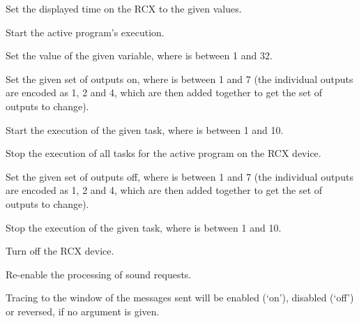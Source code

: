   Set the displayed time on the RCX to the given values.
  
  Start the active program's execution.
  
  Set the value of the given variable, where  is between 1 and 32.
  
  Set the given set of outputs on, where  is between 1 and 7
  (the individual outputs are encoded as 1, 2 and 4, which are then added together to get the set of outputs to change).
  
  Start the execution of the given task, where  is between 1 and 10.
  
  Stop the execution of all tasks for the active program on the RCX device.

  Set the given set of outputs off, where  is between 1 and 7
  (the individual outputs are encoded as 1, 2 and 4, which are then added together to get the set of outputs to change).
  
  Stop the execution of the given task, where  is between 1 and 10.
  
  Turn off the RCX device.
  
  Re-enable the processing of sound requests.

  Tracing to the \MaxName{} window of the messages sent will be enabled (`on'), disabled (`off') or reversed, if no argument is given.
  
  \objListCmdEnd

\objItemFile

\objItemMessage


